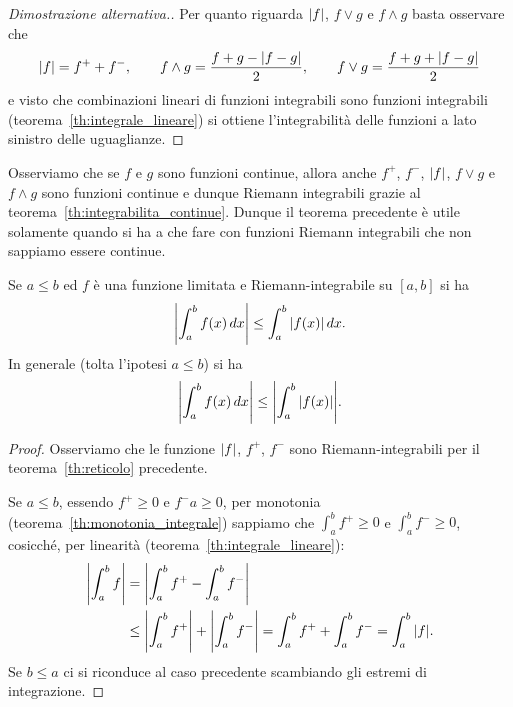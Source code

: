 \begin{proof}[Dimostrazione alternativa.]
  Per quanto riguarda ${\left|f\right|}$, $f\vee g$ e $f\wedge g$  
  basta osservare che%
  \begin{gather*}
    {\left|f\right|} = f^+ + f^-, \qquad
    f\wedge g = \frac{f + g - {\left|f-g\right|}}{2}, \qquad
    f\vee g = \frac{f+g + {\left|f-g\right|}}{2}
  \end{gather*}
  e visto che combinazioni lineari di funzioni integrabili 
  sono funzioni integrabili (teorema~\ref{th:integrale_lineare})
  si ottiene l'integrabilità delle funzioni a lato sinistro
  delle uguaglianze.
\end{proof}

\begin{remark}
Osserviamo che se $f$ e $g$ sono funzioni continue, 
allora anche $f^+$, $f^-$, ${\left|f\right|}$, $f\vee g$ e $f\wedge g$ sono funzioni continue
e dunque Riemann integrabili grazie al teorema~\ref{th:integrabilita_continue}.
Dunque il teorema precedente è utile solamente quando si ha a che fare con funzioni 
Riemann integrabili che non sappiamo essere continue. 
\end{remark}

\begin{theorem}
\label{th:integrale_modulo}%
Se $a\le b$ ed $f$ è una funzione limitata e Riemann-integrabile su $[a,b]$
si ha 
\[
  {\left|\int_a^b f(x)\, dx\right|} \le \int_a^b {\left|f(x)\right|}\, dx.
\]
In generale (tolta l'ipotesi $a \le b$) si ha
\begin{equation}\label{eq:489732}
  {\left|\int_a^b f(x)\, dx\right|} 
  \le 
  {\left|\int_a^b {\left|f(x)\right|}\right|}. 
\end{equation}
\end{theorem}
\begin{proof}
Osserviamo che le funzione ${\left|f\right|}$, $f^+$, $f^-$ sono Riemann-integrabili
per il teorema~\ref{th:reticolo} precedente.

Se $a\le b$, essendo $f^+\ge 0$ e $f^-a\ge 0$,
per monotonia (teorema~\ref{th:monotonia_integrale})
sappiamo che $\int_a^b f^+\ge 0$ 
e $\int_a^b f^-\ge 0$, cosicché, 
per linearità (teorema~\ref{th:integrale_lineare}):
\begin{align*}
{\left|\int_a^b f\right|} 
&= {\left|\int_a^b f^+ - \int_a^b f^-\right|}\\
&\le {\left|\int_a^b f^+\right|} + {\left|\int_a^b f^-\right|}
= \int_a^b f^+ + \int_a^b f^-
= \int_a^b {\left|f\right|}.   
\end{align*}
Se $b\le a$ ci si riconduce al caso precedente scambiando 
gli estremi di integrazione.
\end{proof}


